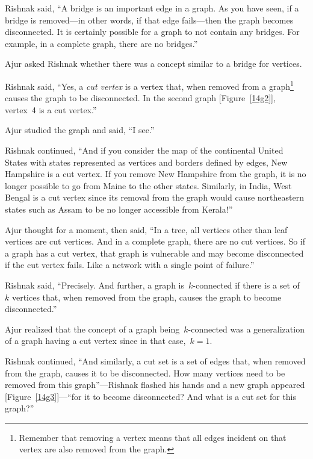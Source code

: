 Rishnak said, ``A bridge is an important edge in a graph. As you have seen, if a bridge is removed---in other words, if that edge fails---then the graph becomes disconnected. It is certainly possible for a graph to not contain any bridges. For example, in a complete graph, there are no
bridges.''

Ajur asked Rishnak whether there was a concept similar to a bridge for vertices.

Rishnak said, ``Yes, a \textit{cut vertex} is a vertex that, when removed from a graph\footnote{Remember that removing a vertex means that all edges incident on that vertex are also removed from the graph.} causes the graph to be disconnected. In the second graph [Figure~\ref{14g2}], vertex~4 is a cut vertex.'' 

Ajur studied the graph and said, ``I see.''

Rishnak continued, ``And if you consider the map of the continental United States with states represented as vertices and borders defined by edges, New Hampshire is a cut vertex. If you remove New Hampshire from the graph, it is no longer possible to go from Maine to the other states. Similarly, in India, West Bengal is a cut vertex since its removal from the graph would cause northeastern states such as Assam to be no longer accessible from Kerala!''

Ajur thought for a moment, then said, ``In a tree, all vertices other than leaf vertices are cut vertices. And in a complete graph, there are no cut vertices. So if a graph has a cut vertex, that graph is vulnerable and may become disconnected if the cut vertex fails. Like a network with a single point of failure.''

Rishnak said, ``Precisely. And further, a graph is~$k$-connected if there is a set of~$k$ vertices that, when removed from the graph, causes the graph to become disconnected.''

Ajur realized that the concept of a graph being~$k$-connected was a generalization of a graph having a cut vertex since in that case,~$k=1$. 

Rishnak continued, ``And similarly, a cut set is a set of edges that, when removed from the graph, causes it to be disconnected. How many vertices need to be removed from this graph''---Rishnak flashed his hands and a new graph appeared [Figure~\ref{14g3}]---``for it to become disconnected? And what is a cut set for this graph?''

